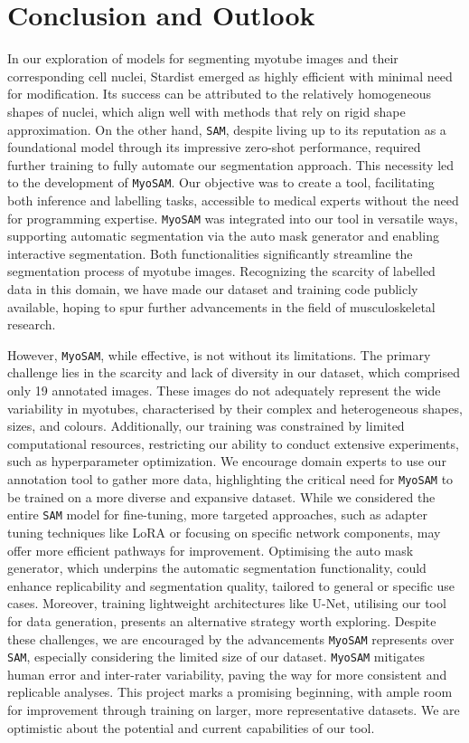 \section{Conclusion and Outlook}
In our exploration of models for segmenting myotube images and their corresponding cell nuclei, Stardist emerged as highly efficient with minimal need for modification. Its success can be attributed to the relatively homogeneous shapes of nuclei, which align well with methods that rely on rigid shape approximation. On the other hand, \texttt{SAM}, despite living up to its reputation as a foundational model through its impressive zero-shot performance, required further training to fully automate our segmentation approach. This necessity led to the development of \texttt{MyoSAM}. Our objective was to create a tool, facilitating both inference and labelling tasks, accessible to medical experts without the need for programming expertise. \texttt{MyoSAM} was integrated into our tool in versatile ways, supporting automatic segmentation via the auto mask generator and enabling interactive segmentation. Both functionalities significantly streamline the segmentation process of myotube images. Recognizing the scarcity of labelled data in this domain, we have made our dataset and training code publicly available, hoping to spur further advancements in the field of musculoskeletal research.

However, \texttt{MyoSAM}, while effective, is not without its limitations. The primary challenge lies in the scarcity and lack of diversity in our dataset, which comprised only 19 annotated images. These images do not adequately represent the wide variability in myotubes, characterised by their complex and heterogeneous shapes, sizes, and colours. Additionally, our training was constrained by limited computational resources, restricting our ability to conduct extensive experiments, such as hyperparameter optimization.
We encourage domain experts to use our annotation tool to gather more data, highlighting the critical need for \texttt{MyoSAM} to be trained on a more diverse and expansive dataset. While we considered the entire \texttt{SAM} model for fine-tuning, more targeted approaches, such as adapter tuning techniques like LoRA or focusing on specific network components, may offer more efficient pathways for improvement. Optimising the auto mask generator, which underpins the automatic segmentation functionality, could enhance replicability and segmentation quality, tailored to general or specific use cases. Moreover, training lightweight architectures like U-Net, utilising our tool for data generation, presents an alternative strategy worth exploring.
Despite these challenges, we are encouraged by the advancements \texttt{MyoSAM} represents over \texttt{SAM}, especially considering the limited size of our dataset. \texttt{MyoSAM} mitigates human error and inter-rater variability, paving the way for more consistent and replicable analyses. This project marks a promising beginning, with ample room for improvement through training on larger, more representative datasets. We are optimistic about the potential and current capabilities of our tool.
